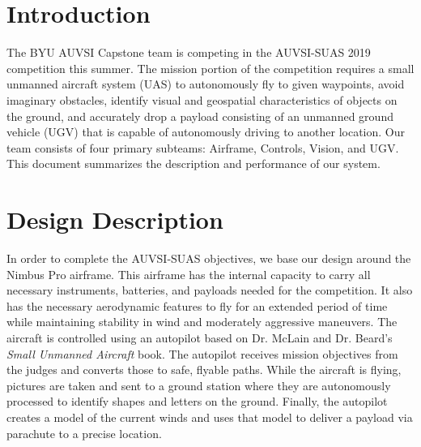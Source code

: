 \documentclass[]{auvsi_doc}
\begin{document}
\begin{AUVSITitlePage}
\begin{artifacttable}
\end{artifacttable}
\end{AUVSITitlePage}

\section{Introduction}

The BYU AUVSI Capstone team is competing in the AUVSI-SUAS 2019 competition this summer. The mission portion of the competition requires a small unmanned aircraft system (UAS) to autonomously fly to given waypoints, avoid imaginary obstacles, identify visual and geospatial characteristics of objects on the ground, and accurately drop a payload consisting of an unmanned ground vehicle (UGV) that is capable of autonomously driving to another location. Our team consists of four primary subteams: Airframe, Controls, Vision, and UGV. This document summarizes the description and performance of our system.

\section{Design Description}
In order to complete the AUVSI-SUAS objectives, we base our design around the Nimbus Pro airframe. This airframe has the internal capacity to carry all necessary instruments, batteries, and payloads needed for the competition. It also has the necessary aerodynamic features to fly for an extended period of time while maintaining stability in wind and moderately aggressive maneuvers. The aircraft is controlled using an autopilot based on Dr. McLain and Dr. Beard's \textit{Small Unmanned Aircraft} book. The autopilot receives mission objectives from the judges and converts those to safe, flyable paths. While the aircraft is flying, pictures are taken and sent to a ground station where they are autonomously processed to identify shapes and letters on the ground. Finally, the autopilot creates a model of the current winds and uses that model to deliver a payload via parachute to a precise location.
\end{document}
